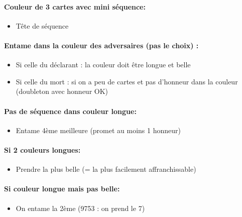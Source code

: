 \documentclass[a4paper]{article}
\begin{document}
\paragraph{Couleur de 3 cartes avec mini séquence:}

\begin{itemize}
\item Tête de séquence

\end{itemize}

\paragraph{Entame dans la couleur des adversaires (pas le choix) :}

\begin{itemize}
\item Si celle du déclarant : la couleur doit être longue et belle

\item Si celle du mort : si on a peu de cartes et pas d’honneur dans la couleur (doubleton avec honneur OK)

\end{itemize}

\paragraph{Pas de séquence dans couleur longue:}

\begin{itemize}
\item Entame 4ème meilleure (promet au moins 1 honneur)

\end{itemize}

\paragraph{Si 2 couleurs longues:}

\begin{itemize}
\item Prendre la plus belle (= la plus facilement affranchissable)

\end{itemize}

\paragraph{Si couleur longue mais pas belle:}

\begin{itemize}
\item On entame la 2ème (9753 : on prend le 7)

\end{itemize}
\end{document}
